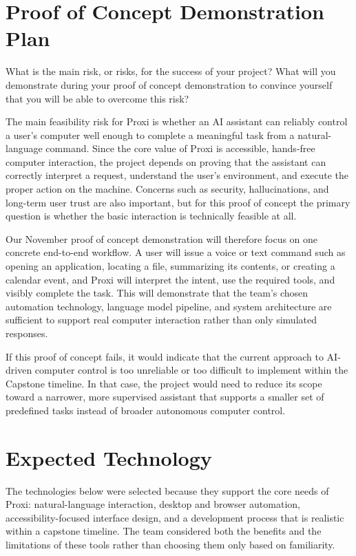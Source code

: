 \documentclass{article}
\begin{document}
\section{Proof of Concept Demonstration Plan}

What is the main risk, or risks, for the success of your project?  What will you
demonstrate during your proof of concept demonstration to convince yourself that
you will be able to overcome this risk?

The main feasibility risk for Proxi is whether an AI assistant can reliably 
control a user's computer well enough to complete a meaningful task from a 
natural-language command. Since the core value of Proxi is accessible, 
hands-free computer interaction, the project depends on proving that the 
assistant can correctly interpret a request, understand the user's environment, 
and execute the proper action on the machine. Concerns such as security, 
hallucinations, and long-term user trust are also important, but for this proof 
of concept the primary question is whether the basic interaction is technically 
feasible at all.

Our November proof of concept demonstration will therefore focus on one concrete 
end-to-end workflow. A user will issue a voice or text command such as opening 
an application, locating a file, summarizing its contents, or creating a 
calendar event, and Proxi will interpret the intent, use the required tools, 
and visibly complete the task. This will demonstrate that the team's chosen 
automation technology, language model pipeline, and system architecture are 
sufficient to support real computer interaction rather than only simulated 
responses.

If this proof of concept fails, it would indicate that the current approach to 
AI-driven computer control is too unreliable or too difficult to implement 
within the Capstone timeline. In that case, the project would need to reduce 
its scope toward a narrower, more supervised assistant that supports a smaller 
set of predefined tasks instead of broader autonomous computer control.


\section{Expected Technology}

The technologies below were selected because they support the core needs
of Proxi: natural-language interaction, desktop and browser automation,
accessibility-focused interface design, and a development process that
is realistic within a capstone timeline. The team considered both the
benefits and the limitations of these tools rather than choosing them
only based on familiarity.
\end{document}
